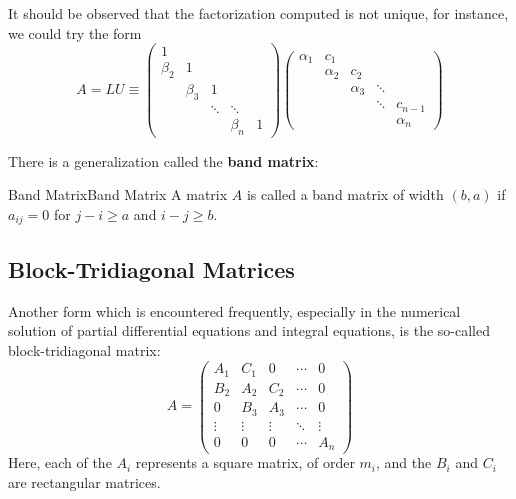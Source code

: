 \documentclass[../main.tex]{subfiles}
\begin{document}
It should be observed that the factorization computed is not unique, for instance, we could try the form
\begin{equation*}
	A = LU \equiv \begin{pmatrix}
		1       &         &        &         &   \\
		\beta_2 & 1       &        &         &   \\
		        & \beta_3 & 1      &         &   \\
		        &         & \ddots & \ddots  &   \\
		        &         &        & \beta_n & 1
	\end{pmatrix} \begin{pmatrix}
		\alpha_1 & c_1      &          &        &          \\
		         & \alpha_2 & c_2      &        &          \\
		         &          & \alpha_3 & \ddots &          \\
		         &          &          & \ddots & c_{n-1}  \\
		         &          &          &        & \alpha_n
	\end{pmatrix}
\end{equation*}

There is a generalization called the \textbf{band matrix}:
\begin{definition}{Band Matrix}{Band Matrix}
	A matrix $A$ is called a band matrix of width $(b,a)$ if $a_{ij} = 0$ for $j - i \geq a$ and $i - j \geq b$.
\end{definition}

\subsection{Block-Tridiagonal Matrices}
Another form which is encountered frequently, especially in the numerical solution of partial differential equations and integral equations, is the so-called block-tridiagonal matrix:
\begin{equation}
	A = \begin{pmatrix}
		A_1    & C_1    & 0      & \cdots & 0      \\
		B_2    & A_2    & C_2    & \cdots & 0      \\
		0      & B_3    & A_3    & \cdots & 0      \\
		\vdots & \vdots & \vdots & \ddots & \vdots \\
		0      & 0      & 0      & \cdots & A_n
	\end{pmatrix}
\end{equation}
Here, each of the $A_i$ represents a square matrix, of order $m_i$, and the $B_i$ and $C_i$ are rectangular matrices.
\end{document}
